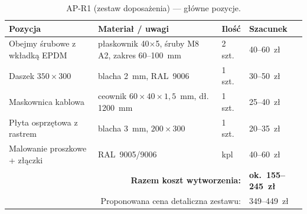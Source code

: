 \documentclass[11pt,a4paper]{article}
\begin{document}
\begin{table}[h]\small
\caption{AP-R1 (zestaw doposażenia) --- główne pozycje.}
\begin{tabular}{p{6.2cm}p{4.6cm}p{2.2cm}p{2.2cm}}
\toprule
Pozycja & Materiał / uwagi & Ilość & Szacunek\\
\midrule
Obejmy śrubowe z wkładką EPDM & płaskownik 40$\times$5, śruby M8 A2, zakres 60--100~mm & 2 szt. & 40--60~zł\\
Daszek $350\times300$ & blacha 2~mm, RAL~9006 & 1 szt. & 30--50~zł\\
Maskownica kablowa & ceownik $60\times40\times1{,}5$~mm, dł. 1200~mm & 1 szt. & 25--40~zł\\
Płyta osprzętowa z rastrem & blacha 3~mm, $200\times300$ & 1 szt. & 20--35~zł\\
Malowanie proszkowe + złączki & RAL~9005/9006 & kpl & 40--60~zł\\
\midrule
\multicolumn{3}{r}{\textbf{Razem koszt wytworzenia:}} & \textbf{ok.~155--245~zł}\\
\multicolumn{3}{r}{Proponowana cena detaliczna zestawu:} & 349--449~zł\\
\bottomrule
\end{tabular}
\end{table}
\end{document}
